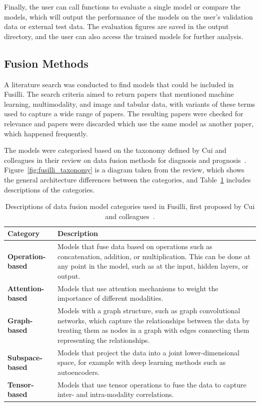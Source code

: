 Finally, the user can call functions to evaluate a single model or compare the models, which will output the performance of the models on the user's validation data or external test data.
The evaluation figures are saved in the output directory, and the user can also access the trained models for further analysis.

\subsection{Fusion Methods}

A literature search was conducted to find models that could be included in Fusilli.
The search criteria aimed to return papers that mentioned machine learning, multimodality, and image and tabular data, with variants of these terms used to capture a wide range of papers.
The resulting papers were checked for relevance and papers were discarded which use the same model as another paper, which happened frequently.

The models were categorised based on the taxonomy defined by Cui and colleagues in their review on data fusion methods for diagnosis and prognosis~\cite{cuiDeepMultimodalFusion2022}.
Figure~\ref{fig:fusilli_taxonomy} is a diagram taken from the review, which shows the general architecture differences between the categories, and Table~\ref{tab:fusilli_taxonomy} includes descriptions of the categories.

\begin{table}
    \centering
    \caption{Descriptions of data fusion model categories used in Fusilli, first proposed by Cui and colleagues~\cite{cuiDeepMultimodalFusion2022}.}
    \label{tab:fusilli_taxonomy}
    \begin{tabular}{|p{}p{}|}
        \hline
        \textbf{Category} & \textbf{Description} \\ \hline
        \textbf{Operation-based} & Models that fuse data based on operations such as concatenation, addition, or multiplication. This can be done at any point in the model, such as at the input, hidden layers, or output. \\ \hline
        \textbf{Attention-based} & Models that use attention mechanisms to weight the importance of different modalities. \\ \hline
        \textbf{Graph-based} & Models with a graph structure, such as graph convolutional networks, which capture the relationships between the data by treating them as nodes in a graph with edges connecting them representing the relationships. \\ \hline
        \textbf{Subspace-based} & Models that project the data into a joint lower-dimensional space, for example with deep learning methods such as autoencoders. \\ \hline
        \textbf{Tensor-based} & Models that use tensor operations to fuse the data to capture inter- and intra-modality correlations. \\ \hline
    \end{tabular}
\end{table}

